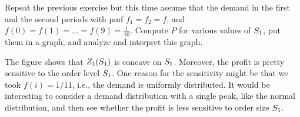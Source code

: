 \begin{exercise}
Repeat the previous exercise but this time assume that the demand in the first and the second periods with pmf $f_1 = f_2 = f$, and $f(0)=f(1)=\ldots=f(9)=\frac{1}{10}$. 
Compute $P$ for various values of $S_1$, put them in a graph, and analyze and interpret this graph.

\begin{solution}

The figure shows that $Z_1(S_1)$ is concave on $S_1$. Moreover, the profit is pretty sensitive to the order level $S_1$. One reason for the sensitivity might be that we took $f(i)=1/11$, i.e., the demand is uniformly distributed. It would be interesting to consider a demand distribution with a single peak, like the normal distribution, and then see whether the profit is less sensitive to order size $S_1$.
\end{solution}
\end{exercise}




\clearpage

